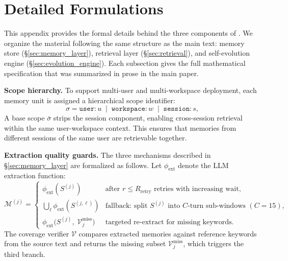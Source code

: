 \newpage
\appendix
\section{Detailed Formulations}
\label{app:detailed_formulations}

This appendix provides the formal details behind the three components of \ours{}. We organize the material following the same structure as the main text: memory store (\S\ref{sec:memory_layer}), retrieval layer (\S\ref{sec:retrieval}), and self-evolution engine (\S\ref{sec:evolution_engine}). Each subsection gives the full mathematical specification that was summarized in prose in the main paper.

\noindent \textbf{Scope hierarchy.} To support multi-user and multi-workspace deployment, each memory unit is assigned a hierarchical scope identifier:
\begin{equation}
    \sigma = \texttt{user}{:}u \;\mid\; \texttt{workspace}{:}w \;\mid\; \texttt{session}{:}s,
    \label{eq:scope}
\end{equation}
A base scope $\bar{\sigma}$ strips the session component, enabling cross-session retrieval within the same user-workspace context. This ensures that memories from different sessions of the same user are retrievable together.

\noindent \textbf{Extraction quality guards.} The three mechanisms described in \S\ref{sec:memory_layer} are formalized as follows. Let $\phi_{\text{ext}}$ denote the LLM extraction function:
\begin{equation}
    \mathcal{M}^{(j)} = \begin{cases}
        \phi_{\text{ext}}(S^{(j)}) & \text{after } r \leq R_{\text{retry}} \text{ retries with increasing wait}, \\
        \bigcup_{\ell} \phi_{\text{ext}}(S^{(j,\ell)}) & \text{fallback: split } S^{(j)} \text{ into } C\text{-turn sub-windows } (C{=}15), \\
        \phi_{\text{ext}}\!\bigl(S^{(j)},\; \mathcal{V}^{\text{miss}}_{j}\bigr) & \text{targeted re-extract for missing keywords}.
    \end{cases}
    \label{eq:extract_guards}
\end{equation}
The coverage verifier $\mathcal{V}$ compares extracted memories against reference keywords from the source text and returns the missing subset $\mathcal{V}^{\text{miss}}_{j}$, which triggers the third branch.

